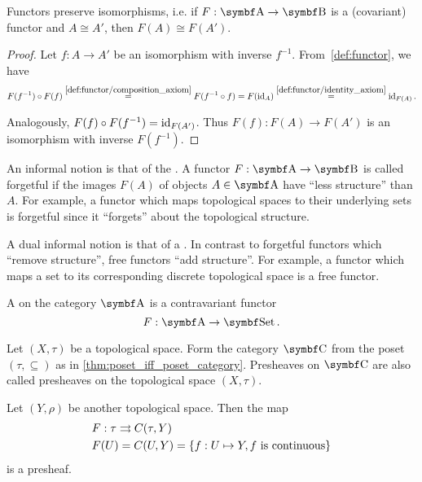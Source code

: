 \begin{proposition}\label{thm:functors_preserve_isomorphisms}\cite[exercise 1.2.21]{Leinster2014}
  Functors preserve isomorphisms, i.e. if \( F: \Bold A \to \Bold B \) is a (covariant) functor and \( A \cong A' \), then \( F(A) \cong F(A') \).
\end{proposition}
\begin{proof}
  Let \( f: A \to A' \) be an isomorphism with inverse \( f^{-1} \). From~\cref{def:functor}, we have
  \begin{align*}
    F(f^{-1}) \circ F(f)
    \overset{\ref{def:functor/composition_axiom}} =
    F(f^{-1} \circ f)
    =
    F(\operatorname{id}_A)
    \overset{\ref{def:functor/identity_axiom}} =
    \operatorname{id}_{F(A)}.
  \end{align*}

  Analogously, \( F(f) \circ F(f^{-1}) = \operatorname{id}_{F(A')} \). Thus \( F(f): F(A) \to F(A') \) is an isomorphism with inverse \( F(f^{-1}) \).
\end{proof}

\begin{remark}\label{remark:forgetful_free_functor}\cite[examples 1.2.3, 1.2.4]{Leinster2014}
  An informal notion is that of the . A functor \( F: \Bold A \to \Bold B \) is called forgetful if the images \( F(A) \) of objects \( A \in \Bold A \) have \enquote{less structure} than \( A \). For example, a functor which maps topological spaces to their underlying sets is forgetful since it \enquote{forgets} about the topological structure.

  A dual informal notion is that of a . In contrast to forgetful functors which \enquote{remove structure}, free functors \enquote{add structure}. For example, a functor which maps a set to its corresponding discrete topological space is a free functor.
\end{remark}

\begin{definition}\label{def:presheaf}\cite[definition 1.2.15]{Leinster2014}
  A  on the category \( \Bold A \) is a contravariant functor
  \begin{equation*}
    F: \Bold A \to \Cat{Set}.
  \end{equation*}
\end{definition}

\begin{example}\label{ex:topological_space_presheaf}\cite[24]{Leinster2014}
  Let \( (X, \tau) \) be a topological space. Form the category \( \Bold C \) from the poset \( (\tau, \subseteq) \) as in \cref{thm:poset_iff_poset_category}. Presheaves on \( \Bold C \) are also called presheaves on the topological space \( (X, \tau) \).

  Let \( (Y, \rho) \) be another topological space. Then the map
  \begin{align*}
    &F: \tau \rightrightarrows C(\tau, Y) \\
    &F(U) = C(U, Y) = \{ f: U \mapsto Y, f \text{ is continuous} \}
  \end{align*}
  is a presheaf.
\end{example}

